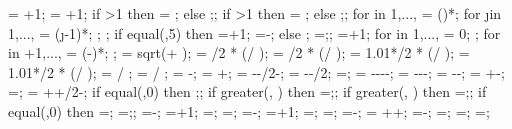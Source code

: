 {{\columnnumber = \baynumber+1; %
\levelnumber = \storynumber+1; %
if \storynumber>1 then {\nlevmo = ;} else {;};
if \baynumber>1 then {\ncolmo = ;} else {;};
for \iii in {1,...,{\levelnumber}}{
\y{\iii} = ()*\storyheight;
for \j in {1,...,{\columnnumber}}{
\x{\j} = (\j-1)*\baywidth;
};
};
if equal(\showsupports,5) then
{=\subfloors+1;
\superstorynumber=\storynumber-\subfloors;}
else
{;
\superstorynumber=\storynumber;};
=+1;
for \idefl in {1,...,{}}{
	 = 0;
};
for \idefl in {+1,...,{\levelnumber}}{
	 = (\idefl-)*\drift;
};
\tempdim = sqrt( + );
\fixbeamx = \collinet/2 * ( / \tempdim);
\fixbeamy = \collinet/2 * ( / \tempdim);
\fixcoly = 1.01*\beamlinet/2 * ( / \tempdim);
\fixcolx = 1.01*\beamlinet/2 * ( / \tempdim);
 =  / \storyheight * \baywidth;
 =  / \storyheight * \baywidth;
\rigbasestartx = -\supportwidth;
\rigbaseendx = \x{\columnnumber}+\supportwidth;
\isoboty = -\supportheight-\baselinet/2-\isolationdepth;
\isotopy = -\supportheight-\baselinet/2;
\isodeflx=\isodeflratio*\isolationdepth*\showdefl;
\foundboty = -\supportheight-\baselinet-\isolationdepth-\foundationdepth;
\foundtopy = -\supportheight-\baselinet-\isolationdepth;
\foundstartx = -\foundsidew-\isodeflx;
\foundendx = \x{\columnnumber}+\foundsidew-\isodeflx;
\structheight=\storynumber*\storyheight;
\isomidy = \supportheight+\isolinet+\isolationdepth/2-\baselinet;
if equal(\subfloors,0) then {;};
if greater(\leftstory, \subfloors) then {\leftstory=\subfloors;};
if greater(\rightstory, \subfloors) then {\rightstory=\subfloors;};
if equal(\showopenstory,0) then
{\leftstory=\subfloors;
\rightstory=\subfloors;};
\leftopenstory=\subfloors-\leftstory;
\leftlevel=\leftstory+1;
\leftwallh=\leftstory*\storyheight;
\leftopenh=\leftopenstory*\storyheight;
\rightopenstory=\subfloors-\rightstory;
\rightlevel=\rightstory+1;
\rightwallh=\rightstory*\storyheight;
\rightopenh=\rightopenstory*\storyheight;
\diffwallh=\leftwallh-\rightwallh;
\soilbelowfoundtof = \soilbelowfound+\supportheight+\hsdistbottom;
\basewallstartx=-\supportwidth;
\buildingwidth=\baynumber*\baywidth;
\basewalldepth=\subfloors*\storyheight;
\basewallstarty=\basewalldepth;
}}
